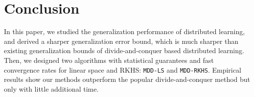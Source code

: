 \documentclass{article}
\begin{document}
\section{Conclusion}
In this paper, we studied the generalization performance of distributed learning,
and derived a sharper generalization error bound,
which is much sharper than existing  generalization bounds of divide-and-conquer based distributed learning.
Then, we designed two algorithms with statistical guarantees and fast convergence rates for linear space and RKHS:
\texttt{MDD-LS} and \texttt{MDD-RKHS}.
Empirical results show our methods outperform the popular divide-and-conquer method but only with little additional time.



\end{document}
